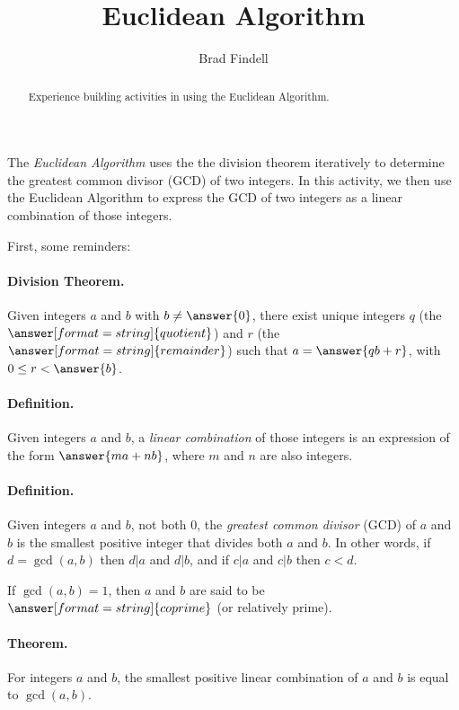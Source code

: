 \documentclass[space,nooutcomes]{ximera}
\title{Euclidean Algorithm}
\author{Brad Findell}
\begin{document}
\begin{abstract}
Experience building activities in using the Euclidean Algorithm.  
\end{abstract}
\maketitle

The \emph{Euclidean Algorithm} uses the the division theorem iteratively to determine the greatest common divisor (GCD) of two integers.  In this activity, we then use the Euclidean Algorithm to express the GCD of two integers as a linear combination of those integers.  

\begin{problem}
First, some reminders: 

\paragraph{Division Theorem.} Given integers $a$ and $b$ with $b\neq \answer{0}$, there exist unique integers $q$ (the $\answer[format=string]{quotient}$) and $r$ (the $\answer[format=string]{remainder}$) such that $a = \answer{qb + r}$, with $0 \leq r < \answer{b}$.

\paragraph{Definition.}
Given integers $a$ and $b$, a \emph{linear combination} of those integers is an expression of the form $\answer{ma+nb}$, where $m$ and $n$ are also integers.  

\paragraph{Definition.}
Given integers $a$ and $b$, not both $0$, the \emph{greatest common divisor} (GCD) of $a$ and $b$ is the smallest positive integer that divides both $a$ and $b$. In other words, if $d=\gcd(a,b)$ then $d|a$ and $d|b$, and if $c|a$ and $c|b$ then $c<d$.  

If $\gcd(a,b)=1$, then $a$ and $b$ are said to be $\answer[format=string]{coprime}$ (or relatively prime). 

\paragraph{Theorem.}
For integers $a$ and $b$, the smallest positive linear combination of $a$ and $b$ is equal to $\gcd(a,b)$.  
\end{problem}
\end{document}
